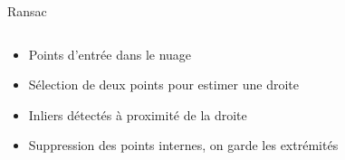 \begin{frame}{Ransac}
\begin{columns}
        \begin{column}{0.5\textwidth}
            \small
            \begin{itemize}
                \item<1-> Points d’entrée dans le nuage
                \item<2-> Sélection de deux points pour estimer une droite
                \item<3-> Inliers détectés à proximité de la droite
                \item<4-> Suppression des points internes, on garde les extrémités
            \end{itemize}

            \vspace{0.5em}
        \end{column}
    \end{columns}
\end{frame}

